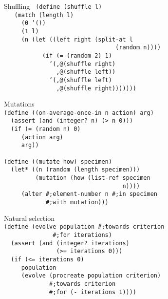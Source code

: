 \documentclass{beamer}
\begin{document}
\begin{frame}{Shuffling}
  \texttt{
(define (shuffle l)\\ \pause
\ \ \ (match (length l)\\ \pause
\ \ \ \ \ (0 '())\\ \pause
\ \ \ \ \ (1 l)\\ \pause
\ \ \ \ \ (n (let ((left right (split-at l \\
\ \ \ \ \ \ \ \ \ \ \ \ \ \ \ \ \ \ \ \ \ \ \ \ \ \ \ \ \ \ \ \
(random n))))\\ \pause
\ \ \ \ \ \ \ \ \ \ \ (if (= (random 2) 1)\\
\ \ \ \ \ \ \ \ \ \ \ \ \ `(,@(shuffle right)\\
\ \ \ \ \ \ \ \ \ \ \ \ \ \ \ ,@(shuffle left))\\ \pause
\ \ \ \ \ \ \ \ \ \ \ \ \ `(,@(shuffle left) \\
\ \ \ \ \ \ \ \ \ \ \ \ \ \ \ ,@(shuffle right)))))))
  }
\end{frame}

\begin{frame}{Mutations}
\texttt{\\
(define ((on-average-once-in n action) arg)\\ \pause
\ \ (assert (and (integer? n) (> n 0)))\\ \pause
\ \ (if (= (random n) 0)\\
\ \ \ \ \ (action arg)\\ \pause
\ \ \ \ \ arg))\\
\ \\ \pause
(define ((mutate how) specimen)\\ \pause
\ \ (let* ((n (random (length specimen)))\\ \pause
\ \ \ \ \ \ \ \ \ (mutation (how (list-ref specimen \\
\ \ \ \ \ \ \ \ \ \ \ \ \ \ \ \ \ \ \ \ \ \ \ \ \ \ \ \ \ \ \ \ \ \
n)))) \\ \pause
\ \ \ \ \ (alter \#;element-number n \#;in specimen\\
\ \ \ \ \ \ \ \ \ \ \ \ \#;with mutation)))
}
\end{frame}

\begin{frame}{Natural selection}
  \texttt{\\
(define (evolve population \#;towards criterion\\
\ \ \ \ \ \ \ \ \ \ \ \ \ \ \#;for iterations)\\ \pause
\ \ (assert (and (integer? iterations)\\
\ \ \ \ \ \ \ \ \ \ \ \ \ \ \ (>= iterations 0)))\\ \pause
\ \ (if (<= iterations 0)\\
\ \ \ \ \ population\\ \pause
\ \ \ \ \ (evolve (procreate population criterion)\\
\ \ \ \ \ \ \ \ \ \ \ \ \ \#;towards criterion \\
\ \ \ \ \ \ \ \ \ \ \ \ \ \#;for (- iterations 1))))
  }
\end{frame}
\end{document}
